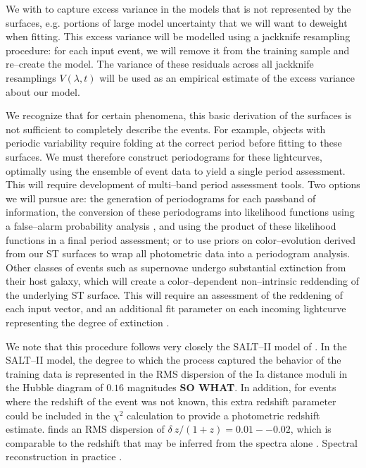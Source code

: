  We with to capture excess
variance in the models that is not represented by the surfaces, e.g. portions of
large model uncertainty that we will want to deweight when fitting.  This excess
variance will be modelled using a jackknife resampling procedure: for each input
event, we will remove it from the training sample and re--create the model.  The
variance of these residuals across all jackknife resamplings $V(\lambda, t)$
will be used as an empirical estimate of the excess variance about our model.

 We recognize that for certain
phenomena, this basic derivation of the surfaces is not sufficient to completely
describe the events. For example, objects with periodic variability require
folding at the correct period before fitting to these surfaces.  We must
therefore construct periodograms for these lightcurves, optimally using the
ensemble of event data to yield a single period assessment.  This will require
development of multi--band period assessment tools.  Two options we will pursue
are: the generation of periodograms for each passband of information, the
conversion of these periodograms into likelihood functions using a false--alarm
probability analysis \citep[e.g.][and references therein]{2009A&A...496..577Z},
and using the product of these likelihood functions in a final period
assessment; or to use priors on color--evolution derived from our ST surfaces to
wrap all photometric data into a periodogram analysis.  Other classes of events
such as supernovae undergo substantial extinction from their host galaxy, which
will create a color--dependent non--intrinsic reddending of the underlying ST
surface.  This will require an assessment of the reddening of each input vector,
and an additional fit parameter on each incoming lightcurve representing the
degree of extinction \cite[Equation 1][]{2007A&A...466...11G}.

 We note that this procedure follows very closely
the SALT--II model of \cite{2007A&A...466...11G}.  In the SALT--II model, the
degree to which the process captured the behavior of the training data is
represented in the RMS dispersion of the Ia distance moduli in the Hubble
diagram of $0.16$ magnitudes {\bf SO WHAT}.  In addition, for events where the
redshift of the event was not known, this extra redshift parameter could be
included in the $\chi^2$ calculation to provide a photometric redshift estimate.
\cite{2007A&A...466...11G} finds an RMS dispersion of $\delta~z/(1 + z) =
0.01--0.02$, which is comparable to the redshift that may be inferred from the
spectra alone \citep[see also][]{2010ApJ...717...40K}. Spectral reconstruction
in practice \citep{2010ApJ...719.1759A}.

